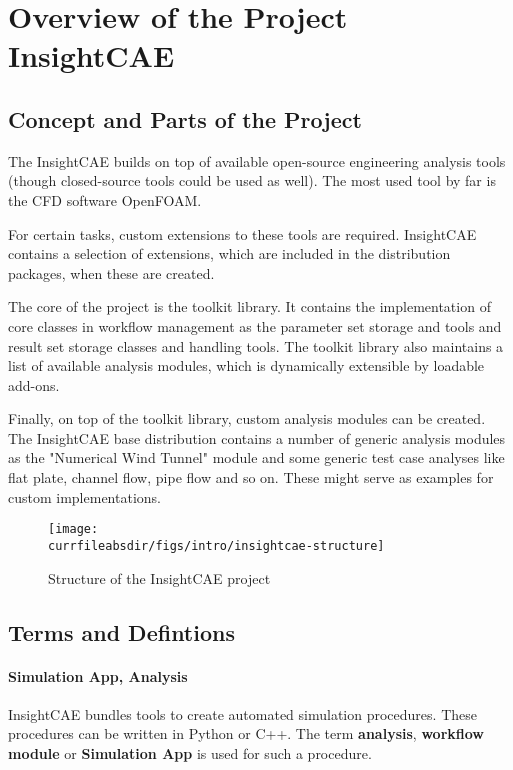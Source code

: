 \section{Overview of the Project InsightCAE}

\subsection{Concept and Parts of the Project}

The InsightCAE builds on top of available open-source engineering analysis tools (though closed-source tools could be used as well). The most used tool by far is the CFD software OpenFOAM.

For certain tasks, custom extensions to these tools are required. InsightCAE contains a selection of extensions, which are included in the distribution packages, when these are created.

The core of the project is the toolkit library. It contains the implementation of core classes in workflow management as the parameter set storage and tools and result set storage classes and handling tools.
The toolkit library also maintains a list of available analysis modules, which is dynamically extensible by loadable add-ons.

Finally, on top of the toolkit library, custom analysis modules can be created.
The InsightCAE base distribution contains a number of generic analysis modules as the "Numerical Wind Tunnel" module and some generic test case analyses like flat plate, channel flow, pipe flow and so on. These might serve as examples for custom implementations.


\begin{figure}[h!]
\centering
\texttt{[image: \\currfileabsdir/figs/intro/insightcae-structure]}
\caption{Structure of the InsightCAE project}
\label{fig:insightcae-structure}
\end{figure}


\subsection{Terms and Defintions}

\paragraph{Simulation App, Analysis}

InsightCAE bundles tools to create automated simulation procedures. These procedures can be written in Python or C++. The term \textbf{analysis}, \textbf{workflow module} or \textbf{Simulation App} is used for such a procedure.

